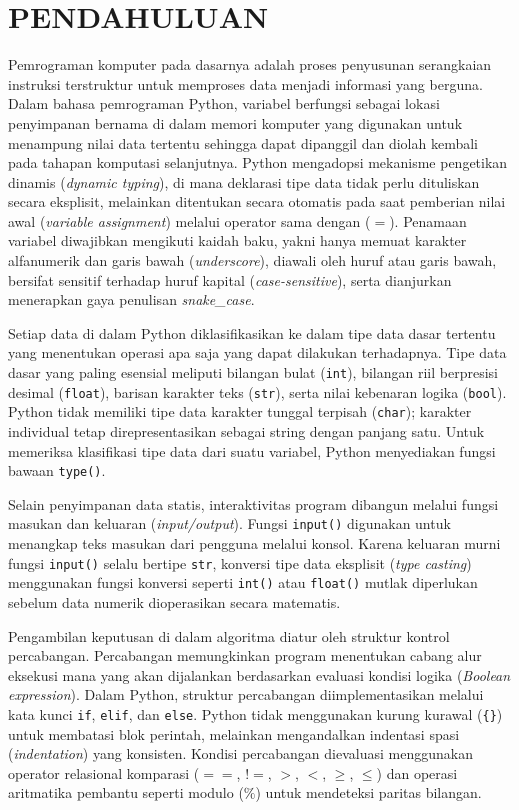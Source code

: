 \documentclass[12pt,a4paper]{article}
\begin{document}
\section{PENDAHULUAN}
Pemrograman komputer pada dasarnya adalah proses penyusunan serangkaian instruksi terstruktur untuk memproses data menjadi informasi yang berguna. Dalam bahasa pemrograman Python, variabel berfungsi sebagai lokasi penyimpanan bernama di dalam memori komputer yang digunakan untuk menampung nilai data tertentu sehingga dapat dipanggil dan diolah kembali pada tahapan komputasi selanjutnya. Python mengadopsi mekanisme pengetikan dinamis (\textit{dynamic typing}), di mana deklarasi tipe data tidak perlu dituliskan secara eksplisit, melainkan ditentukan secara otomatis pada saat pemberian nilai awal (\textit{variable assignment}) melalui operator sama dengan ($=$). Penamaan variabel diwajibkan mengikuti kaidah baku, yakni hanya memuat karakter alfanumerik dan garis bawah (\textit{underscore}), diawali oleh huruf atau garis bawah, bersifat sensitif terhadap huruf kapital (\textit{case-sensitive}), serta dianjurkan menerapkan gaya penulisan \textit{snake\_case}.

Setiap data di dalam Python diklasifikasikan ke dalam tipe data dasar tertentu yang menentukan operasi apa saja yang dapat dilakukan terhadapnya. Tipe data dasar yang paling esensial meliputi bilangan bulat (\texttt{int}), bilangan riil berpresisi desimal (\texttt{float}), barisan karakter teks (\texttt{str}), serta nilai kebenaran logika (\texttt{bool}). Python tidak memiliki tipe data karakter tunggal terpisah (\texttt{char}); karakter individual tetap direpresentasikan sebagai string dengan panjang satu. Untuk memeriksa klasifikasi tipe data dari suatu variabel, Python menyediakan fungsi bawaan \texttt{type()}.

Selain penyimpanan data statis, interaktivitas program dibangun melalui fungsi masukan dan keluaran (\textit{input/output}). Fungsi \texttt{input()} digunakan untuk menangkap teks masukan dari pengguna melalui konsol. Karena keluaran murni fungsi \texttt{input()} selalu bertipe \texttt{str}, konversi tipe data eksplisit (\textit{type casting}) menggunakan fungsi konversi seperti \texttt{int()} atau \texttt{float()} mutlak diperlukan sebelum data numerik dioperasikan secara matematis.

Pengambilan keputusan di dalam algoritma diatur oleh struktur kontrol percabangan. Percabangan memungkinkan program menentukan cabang alur eksekusi mana yang akan dijalankan berdasarkan evaluasi kondisi logika (\textit{Boolean expression}). Dalam Python, struktur percabangan diimplementasikan melalui kata kunci \texttt{if}, \texttt{elif}, dan \texttt{else}. Python tidak menggunakan kurung kurawal (\texttt{\{\}}) untuk membatasi blok perintah, melainkan mengandalkan indentasi spasi (\textit{indentation}) yang konsisten. Kondisi percabangan dievaluasi menggunakan operator relasional komparasi ($==$, $!=$, $>$, $<$, $\ge$, $\le$) dan operasi aritmatika pembantu seperti modulo ($\%$) untuk mendeteksi paritas bilangan.
\end{document}
